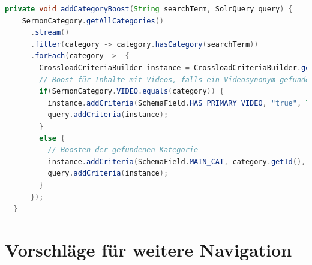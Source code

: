 \begin{lstlisting}[language=Java, title={Code für Überprüfung und Boosten der Kategorien. \cite{solr-search2022}}]
  private void addCategoryBoost(String searchTerm, SolrQuery query) {
    SermonCategory.getAllCategories()
      .stream()
      .filter(category -> category.hasCategory(searchTerm))
      .forEach(category ->  {
        CrossloadCriteriaBuilder instance = CrossloadCriteriaBuilder.getInstance();
        // Boost für Inhalte mit Videos, falls ein Videosynonym gefunden.
        if(SermonCategory.VIDEO.equals(category)) {
          instance.addCriteria(SchemaField.HAS_PRIMARY_VIDEO, "true", 75);
          query.addCriteria(instance);
        }
        else {
          // Boosten der gefundenen Kategorie
          instance.addCriteria(SchemaField.MAIN_CAT, category.getId(), 3);
          query.addCriteria(instance);
        }
      });
  }
\end{lstlisting}

\section{Vorschläge für weitere Navigation}
\label{sec:devSuggestions}

